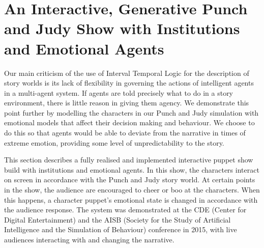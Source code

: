 \documentclass[11pt]{report}
\begin{document}
\section{An Interactive, Generative Punch and Judy Show with Institutions and
  Emotional Agents}
\label{sec:punchjudy}

Our main criticism of the use of Interval Temporal Logic for the description of
story worlds is its lack of flexibility in governing the actions of intelligent
agents in a multi-agent system. If agents are told precisely what to do in a
story environment, there is little reason in giving them agency. We demonstrate
this point further by modelling the characters in our Punch and Judy simulation
with emotional models that affect their decision making and behaviour. We choose
to do this so that agents would be able to deviate from the narrative in times
of extreme emotion, providing some level of unpredictability to the story.

This section describes a fully realised and implemented interactive puppet show
build with institutions and emotional agents. In this show, the characters
interact on screen in accordance with the Punch and Judy story world. At certain
points in the show, the audience are encouraged to cheer or boo at the
characters. When this happens, a character puppet's emotional state is changed
in accordance with the audience response. The system was demonstrated at the CDE
(Center for Digital Entertainment) and the AISB (Society for the Study of
Artificial Intelligence and the Simulation of Behaviour) conference in 2015,
with live audiences interacting with and changing the narrative.
\end{document}
